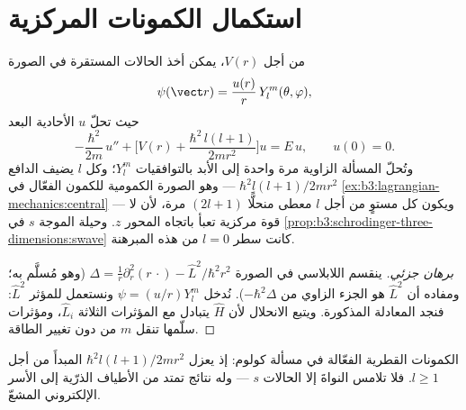 \section{استكمال الكمونات المركزية}

\begin{theorem}\label{thm:b3:quantum-angular-momentum:radial}
من أجل $V(r)$، يمكن أخذ الحالات المستقرة في الصورة
\[
\psi(\vect r) = \frac{u(r)}{r}\,Y_l^m(\theta, \varphi) ,
\]
حيث تحلّ $u$  الأحادية البعد
\[
-\frac{\hbar^2}{2m}\,u'' + \Big[V(r) +
\frac{\hbar^2\,l(l+1)}{2mr^2}\Big]u = E\,u , \qquad u(0) = 0 .
\]
وتُحلّ المسألة الزاوية مرة واحدة إلى الأبد بالتوافقيات $Y_l^m$؛ وكل
$l$ يضيف \emph{} الدافع
$\hbar^2l(l+1)/2mr^2$ --- وهو الصورة الكمومية للكمون الفعّال في
\cref{ex:b3:lagrangian-mechanics:central} --- ويكون كل
مستوٍ من أجل $l$ معطى منحلًّا $(2l+1)$ مرة، لأن لا قوة مركزية
تعبأ باتجاه المحور $z$. وحيلة الموجة $s$ في
\cref{prop:b3:schrodinger-three-dimensions:swave} كانت
سطر $l = 0$ من هذه المبرهنة.
\end{theorem}

\begin{proof}[برهان جزئي]
ينقسم اللابلاسي في الصورة $\Delta = \tfrac1r\partial_r^2(r\,\cdot) -
\hat L^2/\hbar^2r^2$ (وهو مُسلَّم به؛ ومفاده أن $\hat L^2$
هو الجزء الزاوي من $-\hbar^2\Delta$). نُدخل $\psi = (u/r)Y_l^m$
ونستعمل  للمؤثر $\hat L^2$: فنجد المعادلة المذكورة.
ويتبع الانحلال لأن $\hat H$ يتبادل مع المؤثرات الثلاثة $\hat
L_i$، ومؤثرات سلّمها تنقل $m$ من دون تغيير الطاقة.
\end{proof}

\begin{omfigure}

{\small الكمونات القطرية الفعّالة في مسألة كولوم: إذ يعزل
 $\hbar^2l(l+1)/2mr^2$ المبدأَ من أجل
$l \ge 1$. فلا تلامس النواةَ إلا الحالات $s$ --- وله نتائج
تمتد من الأطياف الذرّية إلى الأسر الإلكتروني المشعّ.}
\end{omfigure}

